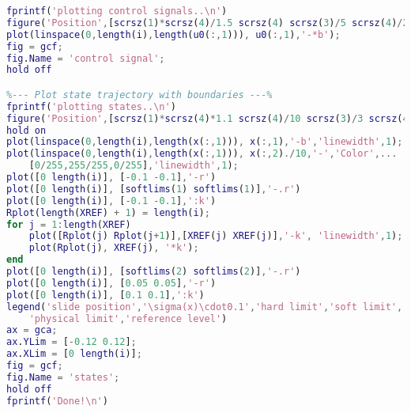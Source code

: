 \begin{lstlisting}[language=matlab]
%--- Plot control signal ---%
fprintf('plotting control signals..\n')
figure('Position',[scrsz(1)*scrsz(4)/1.5 scrsz(4) scrsz(3)/5 scrsz(4)/2.8])
plot(linspace(0,length(i),length(u0(:,1))), u0(:,1),'-*b');
fig = gcf;
fig.Name = 'control signal';
hold off

%--- Plot state trajectory with boundaries ---%
fprintf('plotting states..\n')
figure('Position',[scrsz(1)*scrsz(4)*1.1 scrsz(4)/10 scrsz(3)/3 scrsz(4)/3])
hold on
plot(linspace(0,length(i),length(x(:,1))), x(:,1),'-b','linewidth',1);
plot(linspace(0,length(i),length(x(:,1))), x(:,2)./10,'-','Color',...
    [0/255,255/255,0/255],'linewidth',1);
plot([0 length(i)], [-0.1 -0.1],'-r')
plot([0 length(i)], [softlims(1) softlims(1)],'-.r')
plot([0 length(i)], [-0.1 -0.1],':k')
Rplot(length(XREF) + 1) = length(i);
for j = 1:length(XREF)
    plot([Rplot(j) Rplot(j+1)],[XREF(j) XREF(j)],'-k', 'linewidth',1);
    plot(Rplot(j), XREF(j), '*k');
end
plot([0 length(i)], [softlims(2) softlims(2)],'-.r')
plot([0 length(i)], [0.05 0.05],'-r')
plot([0 length(i)], [0.1 0.1],':k')
legend('slide position','\sigma(x)\cdot0.1','hard limit','soft limit',...
    'physical limit','reference level')
ax = gca;
ax.YLim = [-0.12 0.12];
ax.XLim = [0 length(i)];
fig = gcf;
fig.Name = 'states';
hold off
fprintf('Done!\n')
\end{lstlisting}